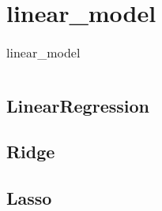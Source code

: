 \chapter{linear\_model\label{linearmodel}}
\begin{table}
    \centering
    \caption{linear\_model}
    \begin{tabular}{lll}
        \hline
        \nameref{LinearRegression} & \nameref{Ridge} & \nameref{Lasso} \\
        \hline
    \end{tabular}
\end{table}
\section{LinearRegression\label{LinearRegression}}
\section{Ridge\label{Ridge}}
\section{Lasso\label{Lasso}}